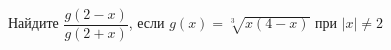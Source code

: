 \begin{ex}
	\begin{condition}
		Найдите \( \dfrac{g(2-x)}{g(2+x)} \), если \( g(x)=\sqrt[3]{x(4-x)} \) при \( |x|\neq2 \)
	\end{condition}
\end{ex}